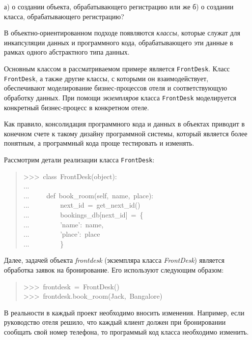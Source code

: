 \documentclass[a4paper,openany,twoside,final]{book}
\providecommand*{\DUroletitlereference}[1]{\textsl{#1}}
\begin{document}
а) \textquotedbl{}о создании объекта, обрабатывающего регистрацию\textquotedbl{} или же
б) \textquotedbl{}о создании класса, обрабатывающего регистрацию\textquotedbl{}?

В объектно-ориентированном подходе появляются \DUroletitlereference{классы}, которые служат
для инкапсуляции данных и программного кода, обрабатывающего эти
данные в рамках одного абстрактного типа данных.

Основным классом в рассматриваемом примере является \texttt{FrontDesk}.
Класс \texttt{FrontDesk}, а также другие классы, с которыми он
взаимодействует, обеспечивают моделирование бизнес-процессов отеля и
соответствующую обработку данных.  При помощи \DUroletitlereference{экземпляров} класса
\texttt{FrontDesk} моделируется конкретный бизнес-процесс в конкретном
отеле.

Как правило, консолидация программного кода и данных в объектах
приводит в конечном счете к такому дизайну программной системы,
который является более понятным, а программный кода проще тестировать
и изменять.

Рассмотрим детали реализации класса \texttt{FrontDesk}:

\begin{quote}{\ttfamily \raggedright \noindent
>{}>{}>~class~FrontDesk(object):\\
...\\
...~~~~~def~book\_room(self,~name,~place):\\
...~~~~~~~~~next\_id~=~get\_next\_id()\\
...~~~~~~~~~bookings\_db{[}next\_id{]}~=~\{\\
...~~~~~~~~~'name':~name,\\
...~~~~~~~~~'place':~place\\
...~~~~~~~~~\}
}
\end{quote}

Далее, задачей объекта \DUroletitlereference{frontdesk} (экземпляра класса \DUroletitlereference{FrontDesk})
является обработка заявок на бронирование.  Его используют следующим
образом:

\begin{quote}{\ttfamily \raggedright \noindent
>{}>{}>~frontdesk~=~FrontDesk()\\
>{}>{}>~frontdesk.book\_room(\textquotedbl{}Jack\textquotedbl{},~\textquotedbl{}Bangalore\textquotedbl{})
}
\end{quote}

В реальности в каждый проект необходимо вносить изменения.  Например,
если руководство отеля решило, что каждый клиент должен при
бронировании сообщать свой номер телефона, то программый код класса
необходимо изменить.
\end{document}
